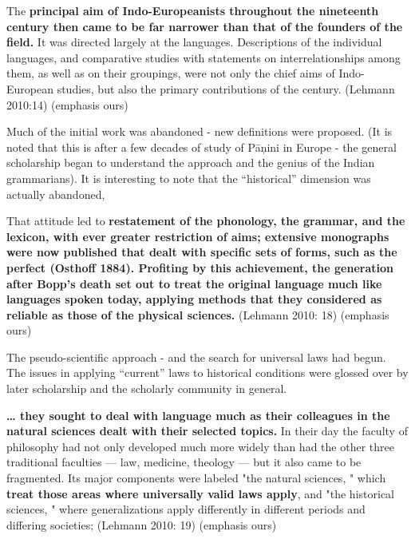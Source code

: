 \begin{myquote}
The \textbf{principal aim of Indo-Europeanists throughout the nineteenth century then came to be far narrower than that of the founders of the field.} It was directed largely at the languages. Descriptions of the individual languages, and comparative studies with statements on interrelationships among them, as well as on their groupings, were not only the chief aims of Indo-European studies, but also the primary contributions of the century. (Lehmann 2010:14) (emphasis ours)
\end{myquote}

\newpage

Much of the initial work was abandoned - new definitions were proposed. (It is noted that this is after a few decades of study of Pāņini in Europe - the general scholarship began to understand the approach and the genius of the Indian grammarians). It is interesting to note that the “historical” dimension was actually abandoned,

\vskip 2pt

\begin{myquote}
That attitude led to \textbf{restatement of the phonology, the grammar, and the lexicon, with ever greater restriction of aims; extensive monographs were now published that dealt with specific sets of forms, such as the perfect (Osthoff 1884). Profiting by this achievement, the generation after Bopp's death set out to treat the original language much like languages spoken today, applying methods that they considered as reliable as those of the physical sciences.} (Lehmann 2010: 18) (emphasis ours)
\end{myquote}

\vskip 2pt

The pseudo-scientific approach - and the search for universal laws had begun. The issues in applying “current” laws to historical conditions were glossed over by later scholarship and the scholarly community in general.

\vskip 2pt

\begin{myquote}
\textbf{… they sought to deal with language much as their colleagues in the natural sciences dealt with their selected topics.} In their day the faculty of philosophy had not only developed much more widely than had the other three traditional faculties — law, medicine, theology — but it also came to be fragmented. Its major components were labeled "the natural sciences, " which \textbf{treat those areas where universally valid laws apply}, and "the historical sciences, " where generalizations apply differently in different periods and differing societies; (Lehmann 2010: 19) (emphasis ours)
\end{myquote}

